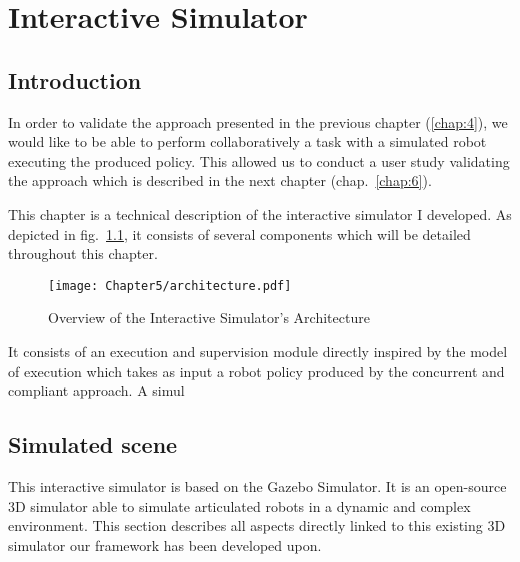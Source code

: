 \ifdefined{}
\else
\setcounter{chapter}{4} %
\dominitoc
\faketableofcontents
\fi

\chapter{Interactive Simulator}
\label{chap:5}
\minitoc

\section{Introduction}

In order to validate the approach presented in the previous chapter (\ref{chap:4}), we would like to be able to perform collaboratively a task with a simulated robot executing the produced policy. This allowed us to conduct a user study validating the approach which is described in the next chapter (chap.~\ref{chap:6}).

This chapter is a technical description of the interactive simulator I developed. As depicted in fig.~\ref{fig:architecture}, it consists of several components which will be detailed throughout this chapter. 

\begin{figure}[h]
    \texttt{[image: Chapter5/architecture.pdf]}
    \caption{Overview of the Interactive Simulator's Architecture}
    \label{fig:architecture}
\end{figure}

It consists of an execution and supervision module directly inspired by the model of execution which takes as input a robot policy produced by the concurrent and compliant approach. A simul     


\section{Simulated scene}

This interactive simulator is based on the Gazebo Simulator. It is an open-source 3D simulator able to simulate articulated robots in a dynamic and complex environment.
This section describes all aspects directly linked to this existing 3D simulator our framework has been developed upon.

